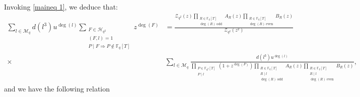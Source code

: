 \documentclass[table]{amsart}
\newcommand{\op}[1]{\operatorname{#1}}
\numberwithin{equation}{section}
\begin{document}
\par Invoking \eqref{maineq 1}, we deduce that:
\begin{equation}\label{main eq 3}
    \begin{split} \sum_{l \in \mathcal{M}_q} d(l^3) u^{\deg(l)} \sum_{\substack{F \in \mathcal{H}_{q^{2}} \\(F, l)=1 \\ P \mid F \Rightarrow P \notin \mathbb{F}_{q}[T]}} z^{\deg(F)}&= \frac{\mathcal{Z}_{q^{2}}(z)\prod_{\substack{R\in \mathbb{F}_{q}[T]  \\ \op{deg}(R)\ \text{odd}}}A_R(z)\prod_{\substack{R\in \mathbb{F}_{q}[T]\\ \op{deg}(R)\ \text{even}}}B_R(z)}{\mathcal{Z}_{q^{2}}\left(z^{2}\right)}  \\\times&
    \sum_{l \in \mathcal{M}_q}  \frac{d(l^3) u^{\deg(l)}}{\prod_{\substack{P \in \mathbb{F}_{q^{2}}[T] \\ P \mid  l}}\left(1+z^{\operatorname{deg}(P)}\right)\prod_{\substack{R\in \mathbb{F}_{q}[T] \\R \mid l\\ \op{deg}(R)\ \text{odd}}}A_R(z)\prod_{\substack{R\in \mathbb{F}_{q}[T] \\ R \mid l \\ \op{deg}(R)\ \text{even}}}B_R(z)},
    \end{split}
\end{equation}
\noindent and we have the following relation
\end{document}
